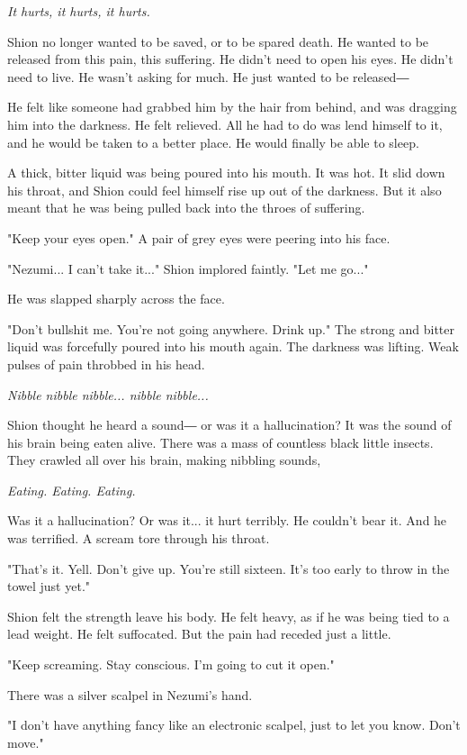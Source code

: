 \emph{It hurts, it hurts, it hurts.}

Shion no longer wanted to be saved, or to be spared death. He wanted to
be released from this pain, this suffering. He didn't need to open his
eyes. He didn't need to live. He wasn't asking for much. He just wanted
to be released―

He felt like someone had grabbed him by the hair from behind, and was
dragging him into the darkness. He felt relieved. All he had to do was
lend himself to it, and he would be taken to a better place. He would
finally be able to sleep.

A thick, bitter liquid was being poured into his mouth. It was hot. It
slid down his throat, and Shion could feel himself rise up out of the
darkness. But it also meant that he was being pulled back into the
throes of suffering.

"Keep your eyes open." A pair of grey eyes were peering into his face.

"Nezumi... I can't take it..." Shion implored faintly. "Let me go..."

He was slapped sharply across the face.

"Don't bullshit me. You're not going anywhere. Drink up." The strong and
bitter liquid was forcefully poured into his mouth again. The darkness
was lifting. Weak pulses of pain throbbed in his head.

\emph{Nibble nibble nibble... nibble nibble...}

Shion thought he heard a sound― or was it a hallucination? It was the
sound of his brain being eaten alive. There was a mass of countless
black little insects. They crawled all over his brain, making nibbling
sounds,

\emph{Eating. Eating. Eating.}

Was it a hallucination? Or was it... it hurt terribly. He couldn't bear
it. And he was terrified. A scream tore through his throat.

"That's it. Yell. Don't give up. You're still sixteen. It's too early to
throw in the towel just yet."

Shion felt the strength leave his body. He felt heavy, as if he was
being tied to a lead weight. He felt suffocated. But the pain had
receded just a little.

"Keep screaming. Stay conscious. I'm going to cut it open."

There was a silver scalpel in Nezumi's hand.

"I don't have anything fancy like an electronic scalpel, just to let you
know. Don't move."

